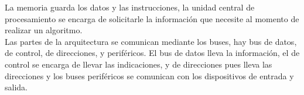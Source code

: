 \documentclass{article}
\begin{document}
La memoria guarda los datos y las instrucciones, la unidad central de procesamiento se encarga de solicitarle la información que necesite al momento de realizar un algoritmo. \\

Las partes de la arquitectura se comunican mediante los buses, hay bus de datos, de control, de direcciones, y periféricos. El bus de datos lleva la información, el de control se encarga de llevar las indicaciones, y de direcciones pues lleva las direcciones y los buses periféricos se comunican con los dispositivos de entrada y salida. 
\end{document}

